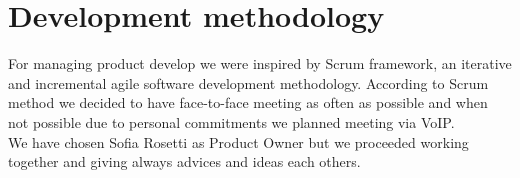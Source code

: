 \documentclass[a4paper,12pt]{report}
\begin{document}



\section{Development methodology}






For managing product develop we were inspired by Scrum framework, an iterative and incremental agile software development methodology.
According to Scrum method we decided to have face-to-face meeting as often as possible and when not possible due to personal commitments we planned meeting via VoIP. \\
We have chosen Sofia Rosetti as Product Owner but we proceeded working together and giving always advices and ideas each others.
\end{document}
